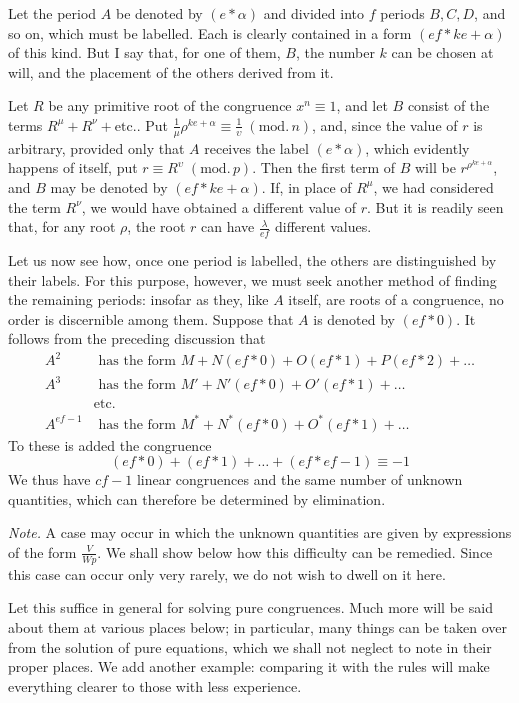 Let the period $A$ be denoted by $(e\ast\alpha)$ and divided into $f$ periods $B,C,D$, and so on, which must be labelled. Each is clearly contained in a form $(ef\ast ke+\alpha)$ of this kind. But I say that, for one of them, $B$, the number $k$ can be chosen at will, and the placement of the others derived from it.

Let $R$ be any primitive root of the congruence $x^n\equiv1$, and let $B$ consist of the terms $R^\mu+R^\nu+\text{etc.}$. Put $\frac1\mu\rho^{ke+\alpha}\equiv\frac1\upsilon\;(\mathrm{mod.}\,n)$, and, since the value of $r$ is arbitrary, provided only that $A$ receives the label $(e\ast\alpha)$, which evidently happens of itself, put $r\equiv R^\upsilon\;(\mathrm{mod.}\,p)$. Then the first term of $B$ will be $r^{\rho^{ke+\alpha}}$, and $B$ may be denoted by
$(ef\ast ke+\alpha)$. If, in place of $R^\mu$, we had considered the term $R^\nu$, we would have obtained a different value of $r$. But it is readily seen that, for any root $\rho$, the root $r$ can have $\frac\lambda{ef}$ different values.

Let us now see how, once one period is labelled, the others are distinguished by their labels. For this purpose, however, we must seek another method of finding the remaining periods: insofar as they, like $A$ itself, are roots of a congruence, no order is discernible among them. Suppose that $A$ is denoted by $(ef\ast0)$. It follows from the preceding discussion that
\[
\begin{aligned}
A^2&\text{ has the form }M+N(ef\ast0)+O(ef\ast1)+P(ef\ast2)+\ldots\\
A^3&\text{ has the form }M'+N'(ef\ast0)+O'(ef\ast1)+\ldots\\
&\text{etc.}\\
A^{ef-1}&\text{ has the form }M^\ast+N^\ast(ef\ast0)+O^\ast(ef\ast1)+\ldots
\end{aligned}
\]
To these is added the congruence
\[
(ef\ast0)+(ef\ast1)+\ldots+(ef\ast ef-1)\equiv-1
\]
We thus have $cf-1$ linear congruences and the same number of unknown quantities, which can therefore be determined by elimination.

\emph{Note.} A case may occur in which the unknown quantities are given by expressions of the form $\frac{V}{Wp}$. We shall show below how this difficulty can be remedied. Since this case can occur only very rarely, we do not wish to dwell on it here.

Let this suffice in general for solving pure congruences. Much more will be said about them at various places below; in particular, many things can be taken over from the solution of pure equations, which we shall not neglect to note in their proper places. We add another example: comparing it with the rules will make everything clearer to those with less experience.

